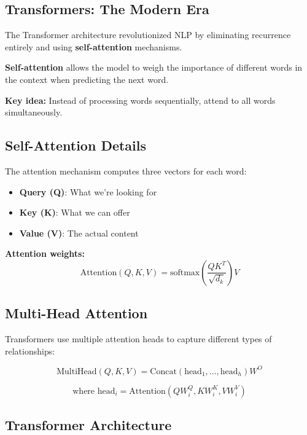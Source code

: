 \documentclass[11pt,a4paper]{article}
\theoremstyle{definition}
\theoremstyle{plain}
\theoremstyle{remark}
\begin{document}
\subsection{Transformers: The Modern Era}

The Transformer architecture revolutionized NLP by eliminating recurrence entirely and using \textbf{self-attention} mechanisms.

\begin{tcolorbox}[colback=purple!5!white,colframe=purple!75!black,title=\textbf{Attention Mechanism}]
\textbf{Self-attention} allows the model to weigh the importance of different words in the context when predicting the next word.

\textbf{Key idea:} Instead of processing words sequentially, attend to all words simultaneously.
\end{tcolorbox}

\subsection{Self-Attention Details}

The attention mechanism computes three vectors for each word:
\begin{itemize}
    \item \textbf{Query (Q)}: What we're looking for
    \item \textbf{Key (K)}: What we can offer
    \item \textbf{Value (V)}: The actual content
\end{itemize}

\textbf{Attention weights:}
\[
\text{Attention}(Q,K,V) = \text{softmax}\left(\frac{QK^T}{\sqrt{d_k}}\right)V
\]

\subsection{Multi-Head Attention}

Transformers use multiple attention heads to capture different types of relationships:

\[
\text{MultiHead}(Q,K,V) = \text{Concat}(\text{head}_1, \ldots, \text{head}_h)W^O
\]

\[
\text{where } \text{head}_i = \text{Attention}(QW_i^Q, KW_i^K, VW_i^V)
\]

\subsection{Transformer Architecture}
\end{document}
